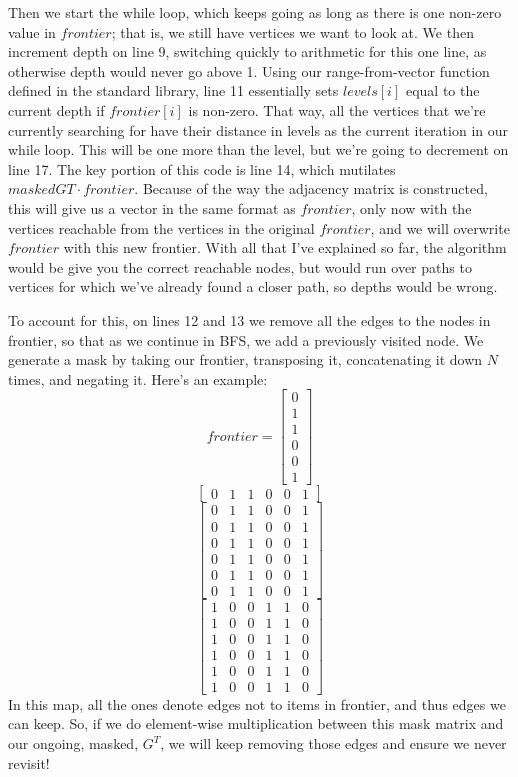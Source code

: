 Then we start the while loop, which keeps going as long as there is one non-zero value in $frontier$; that is, we still have vertices we want to look at.  We then increment depth on line 9, switching quickly to arithmetic for this one line, as otherwise depth would never go above 1.  Using our range-from-vector function defined in the standard library, line 11 essentially sets $levels[i]$ equal to the current depth if $frontier[i]$ is non-zero.  That way, all the vertices that we're currently searching for have their distance in levels as the current iteration in our while loop.  This will be one more than the level, but we're going to decrement on line 17.   The key portion of this code is line 14, which mutilates $maskedGT\cdot frontier$.  Because of the way the adjacency matrix is constructed, this will give us a vector in the same format as $frontier$, only now with the vertices reachable from the vertices in the original $frontier$, and we will overwrite $frontier$ with this new frontier.  With all that I've explained so far, the algorithm would be give you the correct reachable nodes, but would run over paths to vertices for which we've already found a closer path, so depths would be wrong.

To account for this, on lines 12 and 13 we remove all the edges to the nodes in frontier, so that as we continue in BFS, we add a previously visited node.  We generate a mask by taking our frontier, transposing it, concatenating it down $N$ times, and negating it.  Here's an example:
$$frontier = \begin{bmatrix}0 \\1\\1\\0\\0\\1\end{bmatrix}$$
$$\begin{bmatrix}0&1&1&0&0&1\end{bmatrix}$$
$$\begin{bmatrix}
0&1&1&0&0&1\\
0&1&1&0&0&1\\
0&1&1&0&0&1\\
0&1&1&0&0&1\\
0&1&1&0&0&1\\
0&1&1&0&0&1
\end{bmatrix}$$
$$\begin{bmatrix}
1&0&0&1&1&0\\
1&0&0&1&1&0\\
1&0&0&1&1&0\\
1&0&0&1&1&0\\
1&0&0&1&1&0\\
1&0&0&1&1&0
\end{bmatrix}$$
In this map, all the ones denote edges not to items in frontier, and thus edges we can keep.  So, if we do element-wise multiplication between this mask matrix and our ongoing, masked, $G^T$, we will keep removing those edges and ensure we never revisit!

